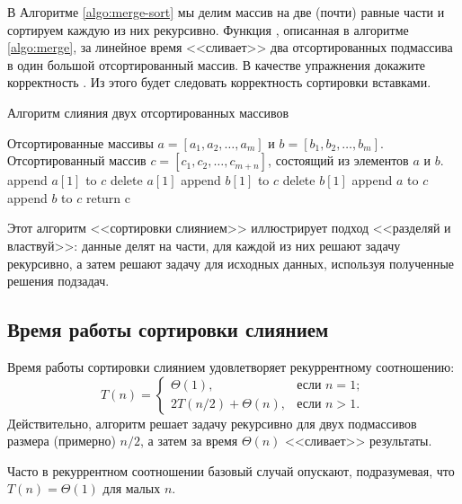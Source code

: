 \documentclass[a4paper,12pt]{article}
\begin{document}
В Алгоритме \ref{algo:merge-sort} мы делим массив на две (почти) равные части и сортируем каждую из них рекурсивно.
Функция , описанная в алгоритме \ref{algo:merge}, за линейное время <<сливает>> два отсортированных подмассива в один большой отсортированный массив. В качестве упражнения докажите корректность . Из этого будет следовать корректность сортировки вставками.
\begin{algorithm}[H]
	\caption{Алгоритм слияния двух отсортированных массивов}
	\label{algo:merge}
	\begin{algorithmic}[1]
		\Require Отсортированные массивы $a = [a_1, a_2, \ldots, a_m]$ и $b = [b_1, b_2, \ldots, b_m]$.
		\Ensure Отсортированный массив $c = [c_1, c_2, \ldots, c_{m + n}]$, состоящий из элементов $a$ и $b$.
				\State append $a[1]$ to $c$
				\State delete $a[1]$
			\Else
				\State append $b[1]$ to $c$
				\State delete $b[1]$
			\EndIf
		\EndWhile
			\State append $a$ to $c$
		\Else
			\State append $b$ to $c$
		\EndIf
		\State return c
		\EndFunction
	\end{algorithmic}
\end{algorithm}

Этот алгоритм <<сортировки слиянием>> иллюстрирует подход <<разделяй и властвуй>>: данные делят на части, для каждой из них решают задачу рекурсивно, а затем решают задачу для исходных данных, используя полученные решения подзадач.

\subsection*{Время работы сортировки слиянием}
Время работы сортировки слиянием удовлетворяет рекуррентному соотношению:
\begin{displaymath}
T(n) = \left\{
\begin{array}{ll}
\Theta(1), & \textrm{если }n = 1;\\
2T(n / 2) + \Theta(n), & \textrm{если }n > 1.
\end{array}
\right.
\end{displaymath}
Действительно, алгоритм решает задачу рекурсивно для двух подмассивов размера (примерно) $n/2$, а затем за время $\Theta(n)$ <<сливает>> результаты.

Часто в рекуррентном соотношении базовый случай опускают, подразумевая, что $T(n) = \Theta(1)$ для малых $n$.
\end{document}
